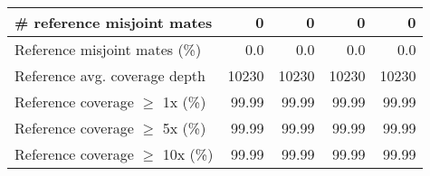 \documentclass[12pt,a4paper]{article}
\begin{document}
\begin{table}[ht]
\begin{center}
\begin{tabular}{|l*{4}{|r}|}
\# reference misjoint mates & 0 & 0 & 0 & 0 \\ \hline
Reference misjoint mates (\%) & 0.0 & 0.0 & 0.0 & 0.0 \\ \hline
Reference avg. coverage depth & 10230 & 10230 & 10230 & 10230 \\ \hline
Reference coverage $\geq$ 1x (\%) & 99.99 & 99.99 & 99.99 & 99.99 \\ \hline
Reference coverage $\geq$ 5x (\%) & 99.99 & 99.99 & 99.99 & 99.99 \\ \hline
Reference coverage $\geq$ 10x (\%) & 99.99 & 99.99 & 99.99 & 99.99 \\ \hline
\end{tabular}
\end{center}
\end{table}
\end{document}
